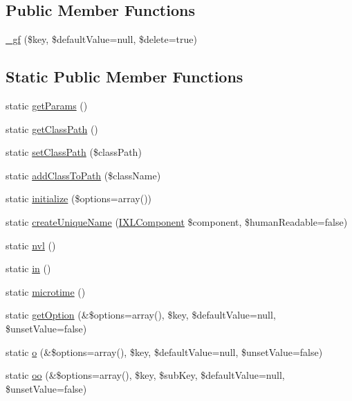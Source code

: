 \subsection*{Public Member Functions}
\begin{DoxyCompactItemize}
\item 
\hyperlink{classYiiXLBase_a1f5b11e66cea38099ad43bd1c41b6dc6}{\_\-gf} (\$key, \$defaultValue=null, \$delete=true)
\end{DoxyCompactItemize}
\subsection*{Static Public Member Functions}
\begin{DoxyCompactItemize}
\item 
static \hyperlink{classYiiXLBase_a8ac5625213c62cbfacb0cc46b085f10c}{getParams} ()
\item 
static \hyperlink{classYiiXLBase_ab65207cbc621cd3db1d453c7256df47f}{getClassPath} ()
\item 
static \hyperlink{classYiiXLBase_a52d5a803007201257f1feb96d49c04cf}{setClassPath} (\$classPath)
\item 
static \hyperlink{classYiiXLBase_ad501575d8881fb84803e2cb2e6cfe2a4}{addClassToPath} (\$className)
\item 
static \hyperlink{classYiiXLBase_a627076e852dcf5ad46f800fe15426fa5}{initialize} (\$options=array())
\item 
static \hyperlink{classYiiXLBase_a63e266f4aeea2000b20b5808038b8aa7}{createUniqueName} (\hyperlink{interfaceIXLComponent}{IXLComponent} \$component, \$humanReadable=false)
\item 
static \hyperlink{classYiiXLBase_a666bf0c7e9a3320e2e1ca2d9b65301e6}{nvl} ()
\item 
static \hyperlink{classYiiXLBase_a41826678a323714d7b160530202af138}{in} ()
\item 
static \hyperlink{classYiiXLBase_a5da7e899ac333e14f5f759d191016e36}{microtime} ()
\item 
static \hyperlink{classYiiXLBase_a0f367d426ee389cfe233f63c598eeedb}{getOption} (\&\$options=array(), \$key, \$defaultValue=null, \$unsetValue=false)
\item 
static \hyperlink{classYiiXLBase_abba281d4c1813d0fb984cbca6784930a}{o} (\&\$options=array(), \$key, \$defaultValue=null, \$unsetValue=false)
\item 
static \hyperlink{classYiiXLBase_ae6db9da820434b8923fa9e87849822fa}{oo} (\&\$options=array(), \$key, \$subKey, \$defaultValue=null, \$unsetValue=false)

\end{DoxyCompactItemize}
